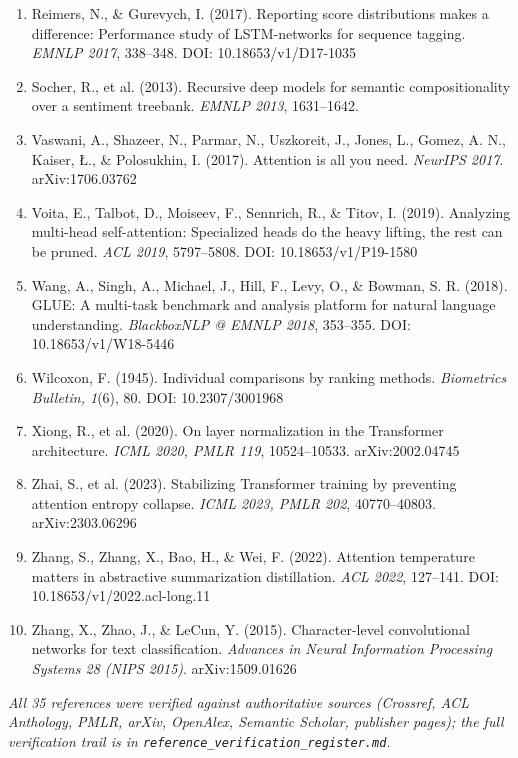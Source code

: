 \documentclass[11pt,a4paper]{article}
\begin{document}
\begin{enumerate}[leftmargin=1.5em,itemsep=1pt]
\item Reimers, N., \& Gurevych, I. (2017). Reporting score distributions makes a difference: Performance study of LSTM-networks for sequence tagging. \emph{EMNLP 2017}, 338--348. DOI: 10.18653/v1/D17-1035
\item Socher, R., et al. (2013). Recursive deep models for semantic compositionality over a sentiment treebank. \emph{EMNLP 2013}, 1631--1642.
\item Vaswani, A., Shazeer, N., Parmar, N., Uszkoreit, J., Jones, L., Gomez, A. N., Kaiser, Ł., \& Polosukhin, I. (2017). Attention is all you need. \emph{NeurIPS 2017}. arXiv:1706.03762
\item Voita, E., Talbot, D., Moiseev, F., Sennrich, R., \& Titov, I. (2019). Analyzing multi-head self-attention: Specialized heads do the heavy lifting, the rest can be pruned. \emph{ACL 2019}, 5797--5808. DOI: 10.18653/v1/P19-1580
\item Wang, A., Singh, A., Michael, J., Hill, F., Levy, O., \& Bowman, S. R. (2018). GLUE: A multi-task benchmark and analysis platform for natural language understanding. \emph{BlackboxNLP @ EMNLP 2018}, 353--355. DOI: 10.18653/v1/W18-5446
\item Wilcoxon, F. (1945). Individual comparisons by ranking methods. \emph{Biometrics Bulletin, 1}(6), 80. DOI: 10.2307/3001968
\item Xiong, R., et al. (2020). On layer normalization in the Transformer architecture. \emph{ICML 2020, PMLR 119}, 10524--10533. arXiv:2002.04745
\item Zhai, S., et al. (2023). Stabilizing Transformer training by preventing attention entropy collapse. \emph{ICML 2023, PMLR 202}, 40770--40803. arXiv:2303.06296
\item Zhang, S., Zhang, X., Bao, H., \& Wei, F. (2022). Attention temperature matters in abstractive summarization distillation. \emph{ACL 2022}, 127--141. DOI: 10.18653/v1/2022.acl-long.11
\item Zhang, X., Zhao, J., \& LeCun, Y. (2015). Character-level convolutional networks for text classification. \emph{Advances in Neural Information Processing Systems 28 (NIPS 2015)}. arXiv:1509.01626
\end{enumerate}

\noindent\emph{All 35 references were verified against authoritative sources (Crossref, ACL Anthology, PMLR, arXiv, OpenAlex, Semantic Scholar, publisher pages); the full verification trail is in \texttt{reference\_verification\_register.md}.}
\end{document}
